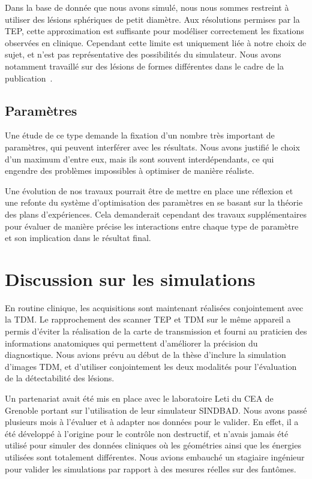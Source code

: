 Dans la base de donnée que nous avons simulé, nous nous sommes restreint à utiliser des lésions sphériques de petit diamètre. Aux résolutions permises par la TEP, cette approximation est suffisante pour modéliser correctement les fixations observées en clinique. Cependant cette limite est uniquement liée à notre choix de sujet, et n'est pas représentative des possibilités du simulateur. Nous avons notamment travaillé sur des lésions de formes différentes dans le cadre de la publication~\cite{le2009incorporating}. 


\subsection{Paramètres}

Une étude de ce type demande  la fixation d'un nombre très important de paramètres, qui peuvent interférer avec les résultats. Nous avons justifié le choix d'un maximum d'entre eux, mais ils sont souvent interdépendants, ce qui engendre des problèmes impossibles à optimiser de manière réaliste. 

Une évolution de nos travaux pourrait être de mettre en place une réflexion et une refonte du système d'optimisation des paramètres en se basant sur la théorie des plans d'expériences. Cela demanderait cependant des travaux supplémentaires pour évaluer de manière précise les interactions entre chaque type de paramètre et son implication dans le résultat final.

\section{Discussion sur les simulations}

En routine clinique, les acquisitions sont maintenant réalisées conjointement avec la TDM. Le rapprochement des scanner TEP et TDM sur le même appareil a permis d'éviter la réalisation de la carte de transmission et fourni au praticien des informations anatomiques qui permettent d'améliorer la précision du diagnostique. Nous avions prévu au début de la thèse d'inclure la simulation d'images TDM, et d'utiliser conjointement les deux modalités pour l'évaluation de la détectabilité des lésions. 

Un partenariat avait été mis en place avec le laboratoire Leti du CEA de Grenoble portant sur l'utilisation de leur simulateur SINDBAD. Nous avons passé plusieurs mois à l'évaluer et à adapter nos données pour le valider. En effet, il a été développé à l'origine pour le contrôle non destructif, et n'avais jamais été utilisé pour simuler des données cliniques où les géométries ainsi que les énergies utilisées sont totalement différentes. Nous avions embauché un stagiaire ingénieur pour valider les simulations par rapport à des mesures réelles sur des fantômes. 

